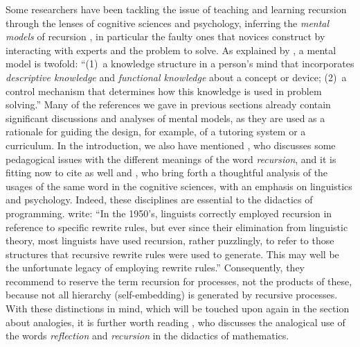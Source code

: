 \documentclass[11pt,a4paper]{article}
\begin{document}
Some researchers have been tackling the issue of teaching and learning
recursion through the lenses of cognitive sciences and psychology,
inferring the \emph{mental models} of recursion
\citep{SandersGalpinGotschi:2006,Mirolo:2009}, in particular the
faulty ones that novices construct by interacting with experts and the
problem to solve. As explained by \textcite{BhuiyanGreerGordon:1994},
a mental model is twofold: ``(1)~a knowledge structure in a person's
mind that incorporates \emph{descriptive knowledge} and
\emph{functional knowledge} about a concept or device; (2)~a control
mechanism that determines how this knowledge is used in problem
solving.'' Many of the references we gave in previous sections already
contain significant discussions and analyses of mental models, as they
are used as a rationale for guiding the design, for example, of a
tutoring system or a curriculum. In the introduction, we also have
mentioned \textcite{Giveon:1990}, who discusses some pedagogical
issues with the different meanings of the word \emph{recursion}, and
it is fitting now to cite as well \textcite{LobinaGarcia:2009} and
\textcite{Lobina:2011,Lobina:2012}, who bring forth a thoughtful
analysis of the usages of the same word in the cognitive sciences,
with an emphasis on linguistics and psychology. Indeed, these
disciplines are essential to the didactics of
programming. \textcite{LobinaGarcia:2009} write: ``In the 1950's,
linguists correctly employed recursion in reference to specific
rewrite rules, but ever since their elimination from linguistic
theory, most linguists have used recursion, rather puzzlingly, to
refer to those structures that recursive rewrite rules were used to
generate. This may well be the unfortunate legacy of employing rewrite
rules.'' Consequently, they recommend to reserve the term recursion
for processes, not the products of these, because not all hierarchy
(self\hyp{}embedding) is generated by recursive processes. With these
distinctions in mind, which will be touched upon again in the section
about analogies, it is further worth reading
\textcite{Kilpatrick:1985}, who discusses the analogical use of the
words \emph{reflection} and \emph{recursion} in the didactics of
mathematics.
\end{document}
